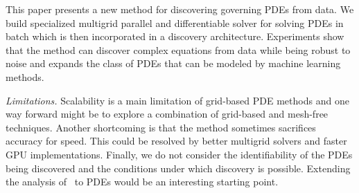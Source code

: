 
This paper presents a new method for discovering governing PDEs from data.
We build specialized multigrid parallel and differentiable solver for solving PDEs in batch which is then incorporated in a discovery architecture.
Experiments show that the method can discover complex equations from data while being robust to noise and expands the class of PDEs that can be modeled by machine learning methods.

\emph{Limitations.} Scalability is a main limitation of grid-based PDE methods and one way forward might be to explore a combination of grid-based and mesh-free techniques.
Another shortcoming is that the method sometimes sacrifices accuracy for speed.
This could be resolved by better multigrid solvers and faster GPU implementations. 
Finally, we do not consider the identifiability of the PDEs being discovered and the conditions under which discovery is possible. Extending the analysis of~\citet{yao2024marrying} to PDEs would be an interesting starting point.
